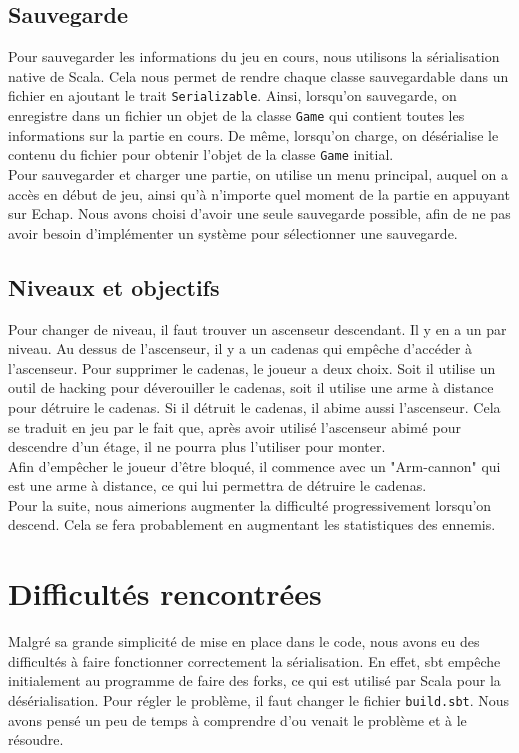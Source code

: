\documentclass[10pt,a4paper]{article}
\begin{document}
\subsection{Sauvegarde}

Pour sauvegarder les informations du jeu en cours, nous utilisons la sérialisation native de Scala. Cela nous permet de rendre chaque classe sauvegardable dans un fichier en ajoutant le trait \texttt{Serializable}. Ainsi, lorsqu'on sauvegarde, on enregistre dans un fichier un objet de la classe \texttt{Game} qui contient toutes les informations sur la partie en cours. De même, lorsqu'on charge, on désérialise le contenu du fichier pour obtenir l'objet de la classe \texttt{Game} initial.\\
Pour sauvegarder et charger une partie, on utilise un menu principal, auquel on a accès en début de jeu, ainsi qu'à n'importe quel moment de la partie en appuyant sur Echap. Nous avons choisi d'avoir une seule sauvegarde possible, afin de ne pas avoir besoin d'implémenter un système pour sélectionner une sauvegarde.\\

\subsection{Niveaux et objectifs}

Pour changer de niveau, il faut trouver un ascenseur descendant. Il y en a un par niveau. Au dessus de l'ascenseur, il y a un cadenas qui empêche d'accéder à l'ascenseur. Pour supprimer le cadenas, le joueur a deux choix. Soit il utilise un outil de hacking pour déverouiller le cadenas, soit il utilise une arme à distance pour détruire le cadenas. Si il détruit le cadenas, il abime aussi l'ascenseur. Cela se traduit en jeu par le fait que, après avoir utilisé l'ascenseur abimé pour descendre d'un étage, il ne pourra plus l'utiliser pour monter.\\
Afin d'emp\^echer le joueur d'\^etre bloqué, il commence avec un "Arm-cannon" qui est une arme à distance, ce qui lui permettra de détruire le cadenas.\\
Pour la suite, nous aimerions augmenter la difficulté progressivement lorsqu'on descend. Cela se fera probablement en augmentant les statistiques des ennemis.

\section{Difficultés rencontrées}

Malgré sa grande simplicité de mise en place dans le code, nous avons eu des difficultés à faire fonctionner correctement la sérialisation. En effet, sbt empêche initialement au programme de faire des forks, ce qui est utilisé par Scala pour la désérialisation. Pour régler le problème, il faut changer le fichier \texttt{build.sbt}. Nous avons pensé un peu de temps à comprendre d'ou venait le problème et à le résoudre.\\
\end{document}
